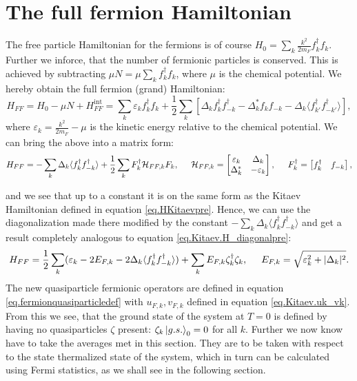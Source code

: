 \section{The full fermion Hamiltonian} \label{sec.HFFfull}
The free particle Hamiltonian for the fermions is of course $H_0 = \sum_k \frac{k^2}{2m_F} f^\dagger_k f_k$. Further we inforce, that the number of fermionic particles is conserved. This is achieved by subtracting $\mu N = \mu \sum_k f^\dagger_k f_k$, where $\mu$ is the chemical potential. We hereby obtain the full fermion (grand) Hamiltonian:
\begin{equation}
H_{FF} = H_0-\mu N + H^\text{int}_{FF} = \sum_k \varepsilon_k f^\dagger_k f_k + \frac{1}{2}\sum_{k} \left[ \Delta_k f^\dagger_k f^\dagger_{-k} - \Delta^*_k f_k f_{-k} - \Delta_k \langle f^\dagger_{k'}f^\dagger_{-k'} \rangle \right], 
\label{eq.HFFdef}
\end{equation} 
where $\varepsilon_k = \frac{k^2}{2m_F}-\mu$ is the kinetic energy relative to the chemical potential. We can bring the above into a matrix form:
\begin{equation}
H_{FF} = -\sum_k \Delta_k\langle f^\dagger_k f^\dagger_{-k}\rangle + \frac{1}{2}\sum_{k} F_k^\dagger \mathcal{H}_{FF,k} F_k, \hspace{0.5cm} \mathcal{H}_{FF,k} = \begin{bmatrix} \varepsilon_k & \Delta_k \\ \Delta^*_k & -\varepsilon_k \end{bmatrix}, \hspace{0.5cm} F^\dagger_k = \begin{bmatrix} f_k^\dagger & f_{-k} \end{bmatrix}, 
\end{equation}

and we see that up to a constant it is on the same form as the Kitaev Hamiltonian defined in equation \eqref{eq.HKitaevpre}. Hence, we can use the diagonalization made there modified by the constant $-\sum_k \Delta_k\langle f^\dagger_k f^\dagger_{-k}\rangle $ and get a result completely analogous to equation \eqref{eq.Kitaev.H_diagonalpre}: 
\begin{equation}
H_{FF} = \frac{1}{2}\sum_k (\varepsilon_k-2E_{F,k}-2\Delta_k\langle f^\dagger_k f^\dagger_{-k}\rangle) + \sum_k E_{F,k} \zeta^\dagger_k \zeta_k, \hspace{0.5cm} E_{F,k} = \sqrt{\varepsilon_k^2 + |\Delta_k|^2}.
\label{eq.Kitaev.HFF_diagonal}
\end{equation}
The new quasiparticle fermionic operators are defined in equation \eqref{eq.fermionquasiparticledef} with $u_{F,k},v_{F,k}$ defined in equation \eqref{eq.Kitaev.uk_vk}. From this we see, that the ground state of the system at $T=0$ is defined by having no quasiparticles $\zeta$ present: $\zeta_k \ket{g.s.}_0 = 0$ for all $k$. Further we now know have to take the averages met in this section. They are to be taken with respect to the state thermalized state of the system, which in turn can be calculated using Fermi statistics, as we shall see in the following section. 

